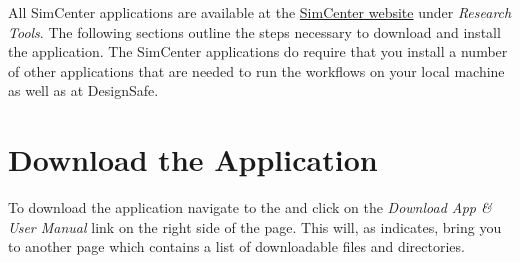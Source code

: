 All SimCenter applications are available at
the \href{https://simcenter.designsafe-ci.org/research-tools/overview/}{SimCenter
website} under \emph{Research Tools}. The following sections outline
the steps necessary to download and install the \texttt{\getsoftwarename{}}
application. The SimCenter applications do require that you install a
number of other applications that are needed to run the workflows on
your local machine as well as at DesignSafe. \\


\section{Download the Application}


To download the \texttt{\getsoftwarename{}} application navigate to
the  and click on
the \emph{Download App \& User Manual} link on the right side of the
page. This will, as  indicates, bring you to another page which contains a list of downloadable files and directories.



